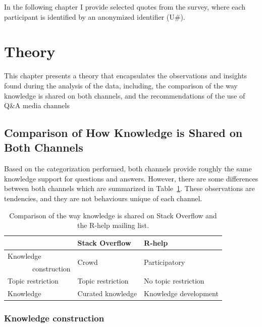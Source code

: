 \documentclass{sig-alternate-05-2015}
\begin{document}
	In the following chapter I provide selected quotes from the survey, where each participant is identified by an anonymized identifier (U\#).


\section{Theory}
\label{cha:theory}

	This chapter presents a theory that encapsulates the observations and insights found during the analysis of the data, including, the comparison of the way knowledge is shared on both channels, and the recommendations of the use of Q\&A media channels

\subsection{Comparison of How Knowledge is Shared on Both Channels}

	Based on the categorization performed, both channels provide roughly the same knowledge support for questions and answers.
	However, there are some differences between both channels which are summarized in Table~\ref{table:constrat}.
	These observations are tendencies, and they are not behaviours unique of each channel.

    \begin{table}[!htb]
      \centering
	  \caption{Comparison of the way knowledge is shared on Stack Overflow and the R-help mailing list.}
	  \label{table:constrat}
	  \begin{tabular}{@{}lll@{}}
        \toprule
        \textbf{}     & \textbf{Stack Overflow} & \textbf{R-help}\\
        \midrule
        Knowledge              & \multirow{2}{*}{Crowd} & \multirow{2}{*}{Participatory} \\
        ~~~~~~~construction    &                   &  \\
        Topic restriction      & Topic restriction & No topic restriction \\
        Knowledge              & Curated knowledge & Knowledge development\\
        \bottomrule
	  \end{tabular}
	\end{table}


	\subsubsection{Knowledge construction}
\end{document}
